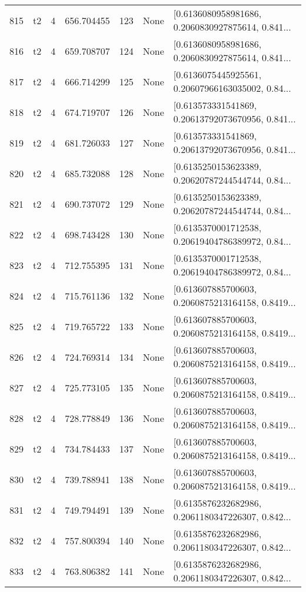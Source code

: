 \begin{tabular}{lllrlll}
815 &  t2 &   4 &   656.704455 &  123 &  None &  [0.6136080958981686, 0.2060830927875614, 0.841... \\
816 &  t2 &   4 &   659.708707 &  124 &  None &  [0.6136080958981686, 0.2060830927875614, 0.841... \\
817 &  t2 &   4 &   666.714299 &  125 &  None &  [0.6136075445925561, 0.20607966163035002, 0.84... \\
818 &  t2 &   4 &   674.719707 &  126 &  None &  [0.613573331541869, 0.20613792073670956, 0.841... \\
819 &  t2 &   4 &   681.726033 &  127 &  None &  [0.613573331541869, 0.20613792073670956, 0.841... \\
820 &  t2 &   4 &   685.732088 &  128 &  None &  [0.6135250153623389, 0.20620787244544744, 0.84... \\
821 &  t2 &   4 &   690.737072 &  129 &  None &  [0.6135250153623389, 0.20620787244544744, 0.84... \\
822 &  t2 &   4 &   698.743428 &  130 &  None &  [0.6135370001712538, 0.20619404786389972, 0.84... \\
823 &  t2 &   4 &   712.755395 &  131 &  None &  [0.6135370001712538, 0.20619404786389972, 0.84... \\
824 &  t2 &   4 &   715.761136 &  132 &  None &  [0.613607885700603, 0.2060875213164158, 0.8419... \\
825 &  t2 &   4 &   719.765722 &  133 &  None &  [0.613607885700603, 0.2060875213164158, 0.8419... \\
826 &  t2 &   4 &   724.769314 &  134 &  None &  [0.613607885700603, 0.2060875213164158, 0.8419... \\
827 &  t2 &   4 &   725.773105 &  135 &  None &  [0.613607885700603, 0.2060875213164158, 0.8419... \\
828 &  t2 &   4 &   728.778849 &  136 &  None &  [0.613607885700603, 0.2060875213164158, 0.8419... \\
829 &  t2 &   4 &   734.784433 &  137 &  None &  [0.613607885700603, 0.2060875213164158, 0.8419... \\
830 &  t2 &   4 &   739.788941 &  138 &  None &  [0.613607885700603, 0.2060875213164158, 0.8419... \\
831 &  t2 &   4 &   749.794491 &  139 &  None &  [0.6135876232682986, 0.2061180347226307, 0.842... \\
832 &  t2 &   4 &   757.800394 &  140 &  None &  [0.6135876232682986, 0.2061180347226307, 0.842... \\
833 &  t2 &   4 &   763.806382 &  141 &  None &  [0.6135876232682986, 0.2061180347226307, 0.842... \\

\end{tabular}
